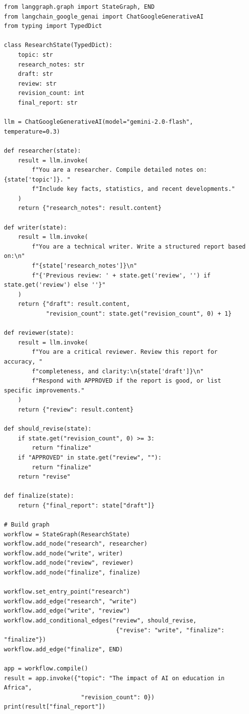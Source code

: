 \begin{verbatim}
from langgraph.graph import StateGraph, END
from langchain_google_genai import ChatGoogleGenerativeAI
from typing import TypedDict

class ResearchState(TypedDict):
    topic: str
    research_notes: str
    draft: str
    review: str
    revision_count: int
    final_report: str

llm = ChatGoogleGenerativeAI(model="gemini-2.0-flash", temperature=0.3)

def researcher(state):
    result = llm.invoke(
        f"You are a researcher. Compile detailed notes on: {state['topic']}. "
        f"Include key facts, statistics, and recent developments."
    )
    return {"research_notes": result.content}

def writer(state):
    result = llm.invoke(
        f"You are a technical writer. Write a structured report based on:\n"
        f"{state['research_notes']}\n"
        f"{'Previous review: ' + state.get('review', '') if state.get('review') else ''}"
    )
    return {"draft": result.content,
            "revision_count": state.get("revision_count", 0) + 1}

def reviewer(state):
    result = llm.invoke(
        f"You are a critical reviewer. Review this report for accuracy, "
        f"completeness, and clarity:\n{state['draft']}\n"
        f"Respond with APPROVED if the report is good, or list specific improvements."
    )
    return {"review": result.content}

def should_revise(state):
    if state.get("revision_count", 0) >= 3:
        return "finalize"
    if "APPROVED" in state.get("review", ""):
        return "finalize"
    return "revise"

def finalize(state):
    return {"final_report": state["draft"]}

# Build graph
workflow = StateGraph(ResearchState)
workflow.add_node("research", researcher)
workflow.add_node("write", writer)
workflow.add_node("review", reviewer)
workflow.add_node("finalize", finalize)

workflow.set_entry_point("research")
workflow.add_edge("research", "write")
workflow.add_edge("write", "review")
workflow.add_conditional_edges("review", should_revise,
                                {"revise": "write", "finalize": "finalize"})
workflow.add_edge("finalize", END)

app = workflow.compile()
result = app.invoke({"topic": "The impact of AI on education in Africa",
                      "revision_count": 0})
print(result["final_report"])
\end{verbatim}

